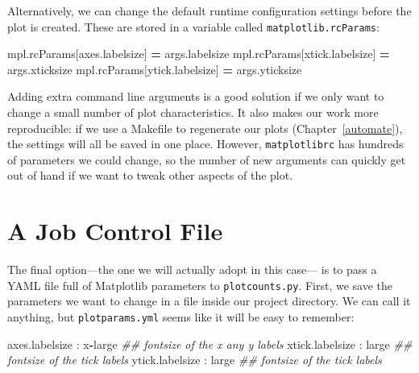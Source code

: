 \documentclass[
]{krantz}
\makeatletter
\newenvironment{Shaded}{\begin{snugshade}}{\end{snugshade}}
\newcommand{\CommentTok}[1]{\textcolor[rgb]{0.56,0.35,0.01}{\textit{#1}}}
\newcommand{\NormalTok}[1]{#1}
\newcommand{\OperatorTok}[1]{\textcolor[rgb]{0.81,0.36,0.00}{\textbf{#1}}}
\newcommand{\StringTok}[1]{\textcolor[rgb]{0.31,0.60,0.02}{#1}}
\newenvironment{kframe}{%
\medskip{}
\setlength{\fboxsep}{.8em}
 \def\at@end@of@kframe{}%
 \ifinner\ifhmode%
  \def\at@end@of@kframe{\end{minipage}}%
  \begin{minipage}{\columnwidth}%
 \fi\fi%
 \def\FrameCommand##1{\hskip\@totalleftmargin \hskip-\fboxsep
 \colorbox{shadecolor}{##1}\hskip-\fboxsep
     \hskip-\linewidth \hskip-\@totalleftmargin \hskip\columnwidth}%
 \MakeFramed {\advance\hsize-\width
   \@totalleftmargin\z@ \linewidth\hsize
   \@setminipage}}%
 {\par\unskip\endMakeFramed%
 \at@end@of@kframe}
\renewenvironment{Shaded}{\begin{kframe}}{\end{kframe}}
\makeatother
\begin{document}
Alternatively,
we can change the default runtime configuration settings before the plot is created.
These are stored in a variable called \texttt{matplotlib.rcParams}:

\begin{Shaded}
\begin{Highlighting}[]
\NormalTok{mpl.rcParams[}\StringTok{\textquotesingle{}axes.labelsize\textquotesingle{}}\NormalTok{] }\OperatorTok{=}\NormalTok{ args.labelsize}
\NormalTok{mpl.rcParams[}\StringTok{\textquotesingle{}xtick.labelsize\textquotesingle{}}\NormalTok{] }\OperatorTok{=}\NormalTok{ args.xticksize}
\NormalTok{mpl.rcParams[}\StringTok{\textquotesingle{}ytick.labelsize\textquotesingle{}}\NormalTok{] }\OperatorTok{=}\NormalTok{ args.yticksize}
\end{Highlighting}
\end{Shaded}

Adding extra command line arguments is a good solution
if we only want to change a small number of plot characteristics.
It also makes our work more reproducible:
if we use a Makefile to regenerate our plots (Chapter~\ref{automate}),
the settings will all be saved in one place.
However,
\texttt{matplotlibrc} has hundreds of parameters we could change,
so the number of new arguments can quickly get out of hand
if we want to tweak other aspects of the plot.

\hypertarget{config-job-file}{%
\section{A Job Control File}\label{config-job-file}}

The final option---the one we will actually adopt in this case--- is
to pass a YAML file full of Matplotlib parameters to \texttt{plotcounts.py}.
First,
we save the parameters we want to change in a file inside our project directory.
We can call it anything,
but \texttt{plotparams.yml} seems like it will be easy to remember:

\begin{Shaded}
\begin{Highlighting}[]
\NormalTok{axes.labelsize   : x}\OperatorTok{{-}}\NormalTok{large  }\CommentTok{\#\# fontsize of the x any y labels}
\NormalTok{xtick.labelsize  : large    }\CommentTok{\#\# fontsize of the tick labels}
\NormalTok{ytick.labelsize  : large    }\CommentTok{\#\# fontsize of the tick labels}
\end{Highlighting}
\end{Shaded}
\end{document}
